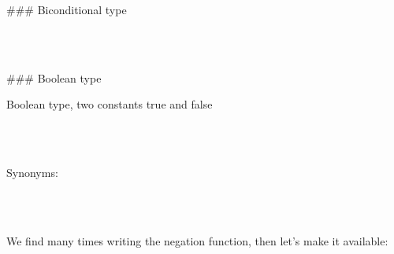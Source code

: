 ### Biconditional type

\begin{code}%
\>[0]\<%
\\
\>[0]\AgdaSpace{}%
\AgdaSymbol{:}\AgdaSpace{}%
\AgdaSpace{}%
\AgdaSymbol{\{}\AgdaSpace{}%
\AgdaSymbol{\}}\AgdaSpace{}%
\AgdaSpace{}%
\AgdaSpace{}%
\AgdaSpace{}%
\AgdaSpace{}%
\AgdaSpace{}%
\AgdaSpace{}%
\AgdaSpace{}%
\AgdaSpace{}%
\AgdaSymbol{(}\AgdaSpace{}%
\AgdaSpace{}%
\AgdaSymbol{)}\<%
\\
\>[0]\AgdaSpace{}%
\AgdaSpace{}%
\AgdaSpace{}%
\AgdaSymbol{=}\AgdaSpace{}%
\AgdaSymbol{(}\AgdaSpace{}%
\AgdaSpace{}%
\AgdaSymbol{)}\AgdaSpace{}%
\AgdaSpace{}%
\AgdaSymbol{(}\AgdaSpace{}%
\AgdaSpace{}%
\AgdaSymbol{)}\<%
\end{code}

### Boolean type

Boolean type, two constants true and false

\begin{code}%
\>[0]\AgdaSpace{}%
\AgdaSpace{}%
\AgdaSymbol{:}\AgdaSpace{}%
\AgdaSpace{}%
\<%
\\
\>[0][@{}l@{\AgdaIndent{0}}]%
\>[2]%
\>[8]\AgdaSymbol{:}\AgdaSpace{}%
\<%
\\
%
\>[2]\AgdaSpace{}%
\AgdaSymbol{:}\AgdaSpace{}%
\<%
\end{code}

Synonyms:
\begin{code}%
\>[0]%
\>[3]\AgdaSymbol{=}\AgdaSpace{}%
\<%
\\
\>[0]\AgdaSpace{}%
\AgdaSymbol{=}\AgdaSpace{}%
\<%
\\
\>[0]\AgdaSpace{}%
\AgdaSymbol{=}\AgdaSpace{}%
\<%
\end{code}

We find many times writing the negation function, then let's
make it available:

